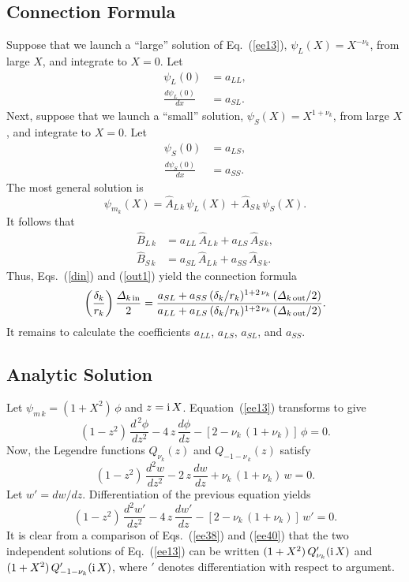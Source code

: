 \documentclass[12pt,prb,aps]{revtex4-1}
\begin{document}
\subsection{Connection Formula}
Suppose that we launch a  ``large''  solution  of Eq.~(\ref{ee13}), $\psi_L(X) = X^{-\nu_k}$, 
from large $X$, and integrate to $X=0$. Let
\begin{align}
\psi_L(0) &= a_{LL},\\[0.5ex]
\frac{d\psi_L(0)}{dx} &= a_{SL}.
\end{align}
Next, suppose that we launch a  ``small'' solution, 
$\psi_S(X) = X^{1+\nu_k}$, 
from large $X$, and integrate to  $X=0$. Let
\begin{align}
\psi_S(0) &= a_{LS},\\[0.5ex]
\frac{d\psi_S(0)}{dx} &= a_{SS}.
\end{align}
The most general solution is
\begin{equation}
\psi_{m_k}(X) = \hat{A}_{L\,k}\,\psi_L(X)+ \hat{A}_{S\,k}\,\psi_S(X).
\end{equation}
It follows that
\begin{align}\label{bin}
\hat{B}_{L\,k} &= a_{LL}\,\hat{A}_{L\,k} + a_{LS}\,\hat{A}_{S\,k},\\[0.5ex]
\hat{B}_{S\,k}&= a_{SL}\,\hat{A}_{L\,k} + a_{SS}\,\hat{A}_{S\,k}.\label{bout}
\end{align}
Thus,  Eqs.~(\ref{din}) and (\ref{out1}) yield the connection formula
\begin{equation}\label{ee20}
\left(\frac{\delta_k}{r_k}\right)\frac{{\mit\Delta}_{k \,{\rm in}}}{2}= \frac{a_{SL} +a_{SS}\,(\delta_k/r_k)^{1+2\,\nu_k}\,({\mit\Delta}_{k\,{\rm out}}/2)}{a_{LL}  +a_{LS}\,(\delta_k/r_k)^{1+2\,\nu_k}\,({\mit\Delta}_{k\,{\rm out}}/2)}.
\end{equation}
It remains to calculate the coefficients $a_{LL}$, $a_{LS}$, $a_{SL}$, and $a_{SS}$. 

\subsection{Analytic Solution}
Let $\psi_{m\,k} = (1+X^2)\,\phi$ and $z={\rm i}\,X$. Equation~(\ref{ee13}) transforms to give 
\begin{equation}\label{ee38}
(1-z^2)\,\frac{d^{\,2}\phi}{dz^2} - 4\,z\,\frac{d\phi}{dz} - [2-\nu_k\,(1+\nu_k)]\,\phi=0.
\end{equation}
Now, the Legendre functions $Q_{\nu_k}(z)$ and $Q_{-1-\nu_{\,k}}(z)$ satisfy\,\cite{abramc}
\begin{equation}
(1-z^2)\,\frac{d^2 w}{dz^2} - 2\,z\,\frac{dw}{dz} + \nu_k\,(1+\nu_k)\,w = 0.
\end{equation}
Let $w'=dw/dz$. Differentiation of the previous equation yields
\begin{equation}\label{ee40}
(1-z^2)\,\frac{d^2w'}{dz^2} - 4\,z\,\frac{dw'}{dz} - [2-\nu_k\,(1+\nu_k)]\,w'=0.
\end{equation}
It is clear from a comparison of Eqs.~(\ref{ee38}) and (\ref{ee40}) that the two independent solutions of Eq.~(\ref{ee13}) can be written 
$(1+X^2)\,Q_{\nu_k}'({\rm i}\,X)$ and $(1+X^2)\,Q_{-1-\nu_k}'({\rm i}\,X)$, where $'$ denotes differentiation with respect to argument. 
\end{document}
